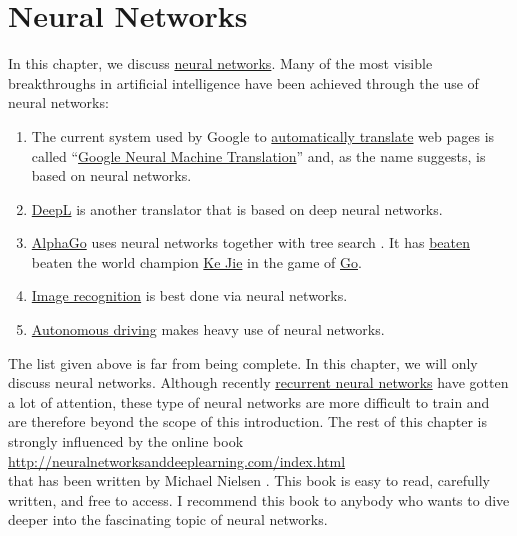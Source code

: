 \chapter{Neural Networks}
In this chapter, we discuss \href{https://en.wikipedia.org/wiki/Artificial_neural_network}{neural networks}.
Many of the most visible breakthroughs in artificial intelligence have been achieved through the use of neural
networks: 
\begin{enumerate}
\item The current system used by Google to \href{https://translate.google.com}{automatically translate} web
      pages is called 
      ``\href{https://en.wikipedia.org/wiki/Google_Neural_Machine_Translation}{Google Neural Machine
        Translation}''
      and,  as the name suggests, is based on neural networks.
\item \href{https://www.deepl.com/translator}{DeepL} is another translator that is based on deep neural networks.      
\item \href{https://de.wikipedia.org/wiki/AlphaGo}{AlphaGo} uses neural networks together with tree search
      \cite{silver:2016}.  It has \href{https://en.wikipedia.org/wiki/AlphaGo_versus_Ke_Jie}{beaten} 
      beaten the world champion \href{https://en.wikipedia.org/wiki/Ke_Jie}{Ke Jie} in the game of
      \href{https://en.wikipedia.org/wiki/Go_(game)}{Go}.
\item \href{https://www.tensorflow.org/tutorials/image_recognition}{Image recognition} is best done via neural networks.
\item \href{https://en.wikipedia.org/wiki/Autonomous_car}{Autonomous driving} makes heavy use of neural networks.
\end{enumerate}
The list given above is far from being complete.  In this chapter, we will only discuss  
neural networks.  Although recently 
\href{https://en.wikipedia.org/wiki/Recurrent_neural_network}{recurrent neural networks} have gotten a lot of
attention, these type of neural networks are more difficult to train and are therefore beyond the scope of this
introduction.  The rest of this chapter is strongly influenced by the online book 
\\[0.2cm]
\hspace*{1.3cm}
\href{http://neuralnetworksanddeeplearning.com/index.html}{http://neuralnetworksanddeeplearning.com/index.html}
\\[0.2cm]
that has been written by Michael Nielsen \cite{nielsen:2015}.  This book is easy to read, carefully written, and
free to access.  I recommend this book to anybody who wants to dive deeper into the fascinating topic of neural
networks.

